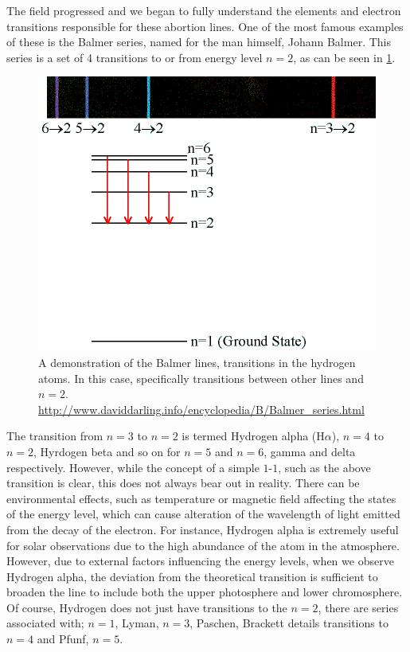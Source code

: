 The field progressed and we began to fully understand the elements and electron transitions responsible for these abortion lines.
One of the most famous examples of these is the Balmer series, named for the man himself, Johann Balmer.
This series is a set of 4 transitions to or from energy level $n = 2$, as can be seen in \ref{fig:balmer}.

\begin{figure}
	\centering
	\includegraphics[scale=0.5]{Chapter1/Figs/Balmer_series}
	\caption{A demonstration of the Balmer lines, transitions in the hydrogen atoms. In this case, specifically transitions between other lines and $n = 2$.
		\url{http://www.daviddarling.info/encyclopedia/B/Balmer_series.html}}
	\label{fig:balmer}
\end{figure}

The transition from $n=3$ to $n=2$ is termed Hydrogen alpha (H$\alpha$), $n=4$ to $n=2$, Hyrdogen beta and so on for $n=5$ and $n=6$, gamma and delta respectively. 
However, while the concept of a simple $1$-$1$, such as the above transition is clear, this does not always bear out in reality.
There can be environmental effects, such as temperature or magnetic field affecting the states of the energy level, which can cause alteration of the wavelength of light emitted from the decay of the electron.
For instance, Hydrogen alpha is extremely useful for solar observations due to the high abundance of the atom in the atmosphere.
However, due to external factors influencing the energy levels, when we observe Hydrogen alpha, the deviation from the theoretical transition is sufficient to broaden the line to include both the upper photosphere and lower chromosphere.
Of course, Hydrogen does not just have transitions to the $n=2$, there are series associated with; $n=1$, Lyman, $n=3$, Paschen, Brackett details transitions to $n=4$ and Pfunf, $n=5$.

